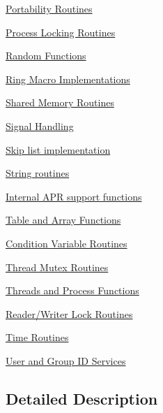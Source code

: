 \begin{DoxyCompactItemize}
\hyperlink{group__apr__portabile}{Portability Routines}
\item 
\hyperlink{group__apr__proc__mutex}{Process Locking Routines}
\item 
\hyperlink{group__apr__random}{Random Functions}
\item 
\hyperlink{group__apr__ring}{Ring Macro Implementations}
\item 
\hyperlink{group__apr__shm}{Shared Memory Routines}
\item 
\hyperlink{group__apr__signal}{Signal Handling}
\item 
\hyperlink{group__apr__skiplist}{Skip list implementation}
\item 
\hyperlink{group__apr__strings}{String routines}
\item 
\hyperlink{group__apr__support}{Internal A\+P\+R support functions}
\item 
\hyperlink{group__apr__tables}{Table and Array Functions}
\item 
\hyperlink{group__apr__thread__cond}{Condition Variable Routines}
\item 
\hyperlink{group__apr__thread__mutex}{Thread Mutex Routines}
\item 
\hyperlink{group__apr__thread__proc}{Threads and Process Functions}
\item 
\hyperlink{group__apr__thread__rwlock}{Reader/\+Writer Lock Routines}
\item 
\hyperlink{group__apr__time}{Time Routines}
\item 
\hyperlink{group__apr__user}{User and Group I\+D Services}
\end{DoxyCompactItemize}


\subsection{Detailed Description}
